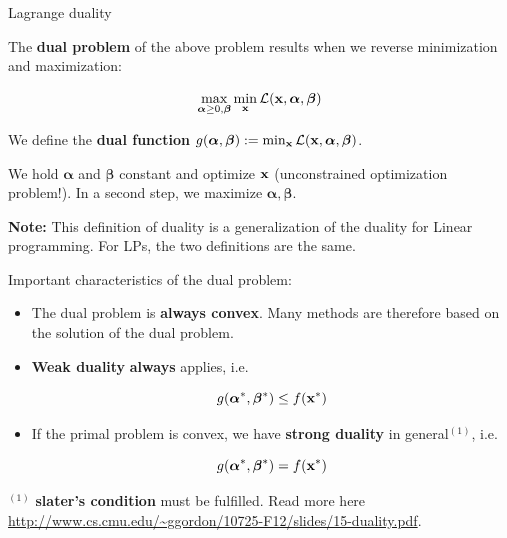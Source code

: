 \begin{vbframe}{Lagrange duality}

The \textbf{dual problem} of the above problem results when we reverse minimization and maximization:

$$
\max_{\bm{\alpha} \ge 0, \bm{\beta}} \min_{\mathbf{x}}  \mathcal{L}(\mathbf{x}, \bm{\alpha}, \bm{\beta})
$$

We define the \textbf{dual function} $g(\bm{\alpha}, \bm{\beta}) := \min_{\mathbf{x}}  \mathcal{L}(\mathbf{x}, \bm{\alpha}, \bm{\beta})$.

\lz

We hold $\bm{\alpha}$ and $\bm{\beta}$ constant and optimize $\mathbf{x}$ (unconstrained optimization problem!). In a second step, we maximize $\bm{\alpha}, \bm{\beta}$.

\lz

\textbf{Note:} This definition of duality is a generalization of the duality for Linear programming. For LPs, the two definitions are the same.


\framebreak

Important characteristics of the dual problem:

\begin{itemize}
\item The dual problem is \textbf{always convex}. Many methods are therefore based on the solution of the dual problem.
\item \textbf{Weak duality} \textbf{always} applies, i.e.

$$
g(\bm{\alpha}^*, \bm{\beta}^*) \le f(\mathbf{x}^*)
$$
\item If the primal problem is convex, we have \textbf{strong duality} in general$^{(1)}$, i.e.

$$
g(\bm{\alpha}^*, \bm{\beta}^*) = f(\mathbf{x}^*)
$$
\end{itemize}

\vfill

\begin{footnotesize}
$^{(1)}$ \textbf{slater's condition} must be fulfilled. Read more here \url{http://www.cs.cmu.edu/~ggordon/10725-F12/slides/15-duality.pdf}.
\end{footnotesize}

\end{vbframe}






